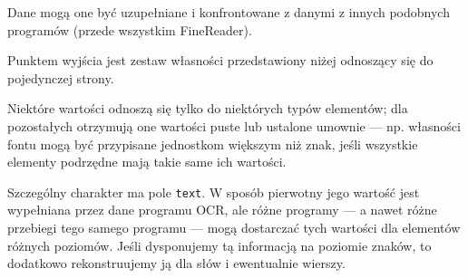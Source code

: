 \documentclass[12]{mwart}
\def\p#1{\textsf{#1}}
\begin{document}
Dane mogą one być uzupełniane i konfrontowane z danymi z
innych podobnych programów (przede wszystkim \p{FineReader}). 

Punktem wyjścia jest zestaw własności przedstawiony niżej odnoszący
się do pojedynczej strony.

Niektóre wartości odnoszą się tylko do niektórych typów elementów; dla
pozostałych otrzymują one wartości puste lub ustalone umownie ---
np. własności fontu mogą być przypisane jednostkom większym niż znak,
jeśli wszystkie elementy podrzędne mają takie same ich wartości.

Szczególny charakter ma pole \texttt{text}. W sposób pierwotny jego
wartość jest wypełniana przez dane programu OCR, ale różne programy
--- a nawet różne przebiegi tego samego programu --- mogą dostarczać
tych wartości dla elementów różnych poziomów. Jeśli dysponujemy tą
informacją na poziomie znaków, to dodatkowo rekonstruujemy ją dla słów
i ewentualnie wierszy.

\end{document}
